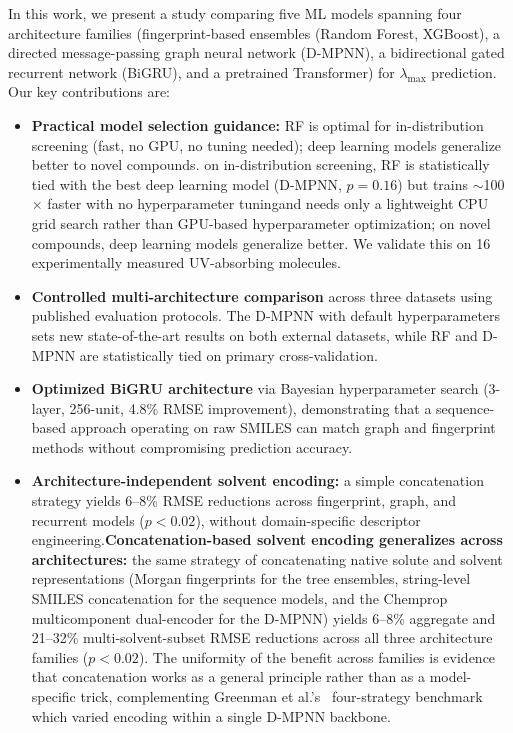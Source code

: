 \documentclass[journal=jcisd8,manuscript=article]{achemso}
\newcommand{\added}[1]{{\color{addedblue}#1}}
\newcommand{\removed}[1]{{\color{removedred}#1}}
\newcommand{\addedii}[1]{{\color{addedgreen}#1}}
\newcommand{\removedii}[1]{{\color{removedorange}#1}}
\begin{document}
In this work, we present a study comparing five ML models spanning four architecture families (fingerprint-based ensembles (Random Forest, XGBoost), a directed message-passing graph neural network (D-MPNN), a bidirectional gated recurrent network (BiGRU), and a pretrained Transformer) for $\lambda_{\max}$ prediction.
Our key contributions are:
\begin{itemize}
 \item \textbf{Practical model selection guidance:} \removed{RF is optimal for in-distribution screening (fast, no GPU, no tuning needed); deep learning models generalize better to novel compounds.} \added{on in-distribution screening, RF is statistically tied with the best deep learning model (D-MPNN, $p = 0.16$) but trains $\sim$100$\times$ faster \removedii{with no hyperparameter tuning}\addedii{and needs only a lightweight CPU grid search rather than GPU-based hyperparameter optimization}; on novel compounds, deep learning models generalize better.} We validate this on 16 experimentally measured UV-absorbing molecules.
 \item \textbf{Controlled multi-architecture comparison} across three datasets using published evaluation protocols. The D-MPNN with default hyperparameters sets new state-of-the-art results on both external datasets, while RF and D-MPNN are statistically tied on primary cross-validation.
 \item \textbf{Optimized BiGRU architecture} via Bayesian hyperparameter search (3-layer, 256-unit, 4.8\% RMSE improvement), demonstrating that a sequence-based approach operating on raw SMILES can match graph and fingerprint methods without compromising prediction accuracy.
 \item \removed{\textbf{Architecture-independent solvent encoding:} a simple concatenation strategy yields 6--8\% RMSE reductions across fingerprint, graph, and recurrent models ($p < 0.02$), without domain-specific descriptor engineering.}\added{\textbf{Concatenation-based solvent encoding generalizes across architectures:} the same strategy of concatenating native solute and solvent representations (Morgan fingerprints for the tree ensembles, string-level SMILES concatenation for the sequence models, and the Chemprop multicomponent dual-encoder for the D-MPNN) yields 6--8\% aggregate and 21--32\% multi-solvent-subset RMSE reductions across all three architecture families ($p < 0.02$). The uniformity of the benefit across families is evidence that concatenation works as a general principle rather than as a model-specific trick, complementing Greenman et al.'s~\cite{greenman2022multifidelity} four-strategy benchmark which varied encoding within a single D-MPNN backbone.}

\end{itemize}
\end{document}
